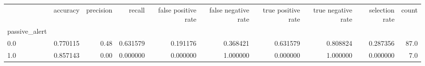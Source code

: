 \begin{tabular}{lrrrrrrrrr}
\toprule
{} &  accuracy &  precision &    recall &  false positive rate &  false negative rate &  true positive rate &  true negative rate &  selection rate &  count \\
passive\_alert &           &            &           &                      &                      &                     &                     &                 &        \\
\midrule
0.0           &  0.770115 &       0.48 &  0.631579 &             0.191176 &             0.368421 &            0.631579 &            0.808824 &        0.287356 &   87.0 \\
1.0           &  0.857143 &       0.00 &  0.000000 &             0.000000 &             1.000000 &            0.000000 &            1.000000 &        0.000000 &    7.0 \\
\bottomrule
\end{tabular}
